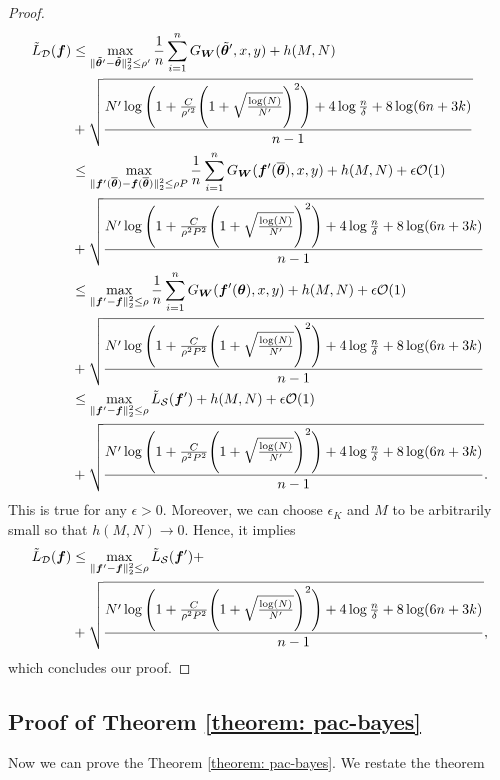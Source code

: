 \begin{proof}
\begin{align*}
     \Tilde{L}_{\mathcal{D}} ({\bm{f}}) &\leq \max_{\|\Tilde{{\bm{\theta}}}' - \Tilde{{\bm{\theta}}}\|^2_2 \leq \rho'} \frac{1}{n}\sum_{i = 1}^n G_{\bm{W}}(\Tilde{{\bm{\theta}}}', x, y)  + h(M, N)\\
    &+ \sqrt{\frac{N' \log \Bigg(1 + \frac{C}{\rho'^2}\Bigg(1+ \sqrt{\frac{\log(N)}{N'}}\Bigg)^2 \Bigg)+4\log\frac{n}{\delta}+8\log(6n+3k)}{n-1}}\\
    & \leq \max_{\|{\bm{f}}'(\overline{{\bm{\theta}}}) - {\bm{f}}(\overline{{\bm{\theta}}})\|^2_2 \leq \rho P} \frac{1}{n}\sum_{i = 1}^n G_{\bm{W}}({\bm{f}}'(\overline{{\bm{\theta}}}), x, y)  + h(M, N) + \epsilon {\mathcal{O}}(1)\\
    &+ \sqrt{\frac{N' \log \Bigg(1 + \frac{C}{\rho^2P^2}\Bigg(1+ \sqrt{\frac{\log(N)}{N'}}\Bigg)^2 \Bigg)+4\log\frac{n}{\delta}+8\log(6n+3k)}{n-1}}\\
    &\leq \max_{\|{\bm{f}}' - {\bm{f}}\|^2_2 \leq \rho} \frac{1}{n}\sum_{i = 1}^n G_{\bm{W}}({\bm{f}}'({\bm{\theta}}), x, y)  + h(M, N) + \epsilon {\mathcal{O}}(1)\\
    &+ \sqrt{\frac{N' \log \Bigg(1 + \frac{C}{\rho^2 P^2}\Bigg(1+ \sqrt{\frac{\log(N)}{N'}}\Bigg)^2 \Bigg)+4\log\frac{n}{\delta}+8\log(6n+3k)}{n-1}}\\
    &\leq \max_{\|{\bm{f}}' - {\bm{f}}\|^2_2 \leq \rho}\Tilde{L}_{\mathcal{S}}({\bm{f}}') + h(M,N) + \epsilon {\mathcal{O}}(1)\\
    &+ \sqrt{\frac{N' \log \Bigg(1 + \frac{C}{\rho^2 P^2}\Bigg(1+ \sqrt{\frac{\log(N)}{N'}}\Bigg)^2 \Bigg)+4\log\frac{n}{\delta}+8\log(6n+3k)}{n-1}}.\\
\end{align*}
This is true for any $\epsilon > 0$.  Moreover, we can choose $\epsilon_K$ and $M$ to be arbitrarily small so that $h(M, N) \to 0$. Hence, it implies
\begin{align*}
     \Tilde{L}_{\mathcal{D}} ({\bm{f}}) &\leq \max_{\|{\bm{f}}' - {\bm{f}}\|^2_2 \leq \rho}\Tilde{L}_{\mathcal{S}}({\bm{f}}') + \\
         &+ \sqrt{\frac{N' \log \Bigg(1 + \frac{C}{\rho^2 P^2}\Bigg(1+ \sqrt{\frac{\log(N)}{N'}}\Bigg)^2 \Bigg)+4\log\frac{n}{\delta}+8\log(6n+3k)}{n-1}},\\
\end{align*}
which concludes our proof.
\end{proof}
\subsection{Proof of Theorem \ref{theorem: pac-bayes}}
Now we can prove the Theorem \ref{theorem: pac-bayes}. We restate the theorem

